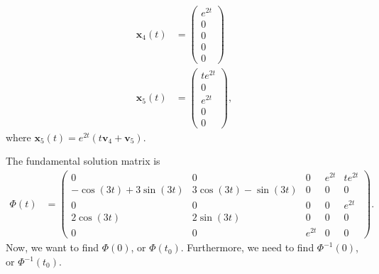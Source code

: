 \documentclass[10pt]{mypackage}
\begin{document}
\begin{example}
\begin{align*}
    \mathbf{x}_4(t) &= \begin{pmatrix}e^{2t}\\0\\0\\0\\0\end{pmatrix}\\
    \mathbf{x}_5(t) &= \begin{pmatrix}te^{2t}\\0\\e^{2t}\\0\\0\end{pmatrix},
  \end{align*}
  where $\mathbf{x}_5(t) = e^{2t}\left( t\mathbf{v}_4 + \mathbf{v}_5 \right)$.\newline

  The fundamental solution matrix is
  \begin{align*}
    \Phi(t) &= \begin{pmatrix}0 & 0 & 0 & e^{2t} & te^{2t} \\ -\cos\left( 3t \right) + 3\sin\left( 3t \right) & 3\cos\left( 3t \right) - \sin\left( 3t \right) & 0 & 0 & 0 \\ 0 & 0 & 0 & 0 & e^{2t} \\ 2\cos\left( 3t \right) & 2\sin\left( 3t \right) & 0 & 0 & 0 \\ 0 & 0 & e^{2t} & 0 & 0\end{pmatrix}.
  \end{align*}
  Now, we want to find $\Phi(0)$, or $\Phi\left( t_0 \right)$. Furthermore, we need to find $\Phi^{-1}(0)$, or $\Phi^{-1}\left( t_0 \right)$.
\end{example}
\end{document}
